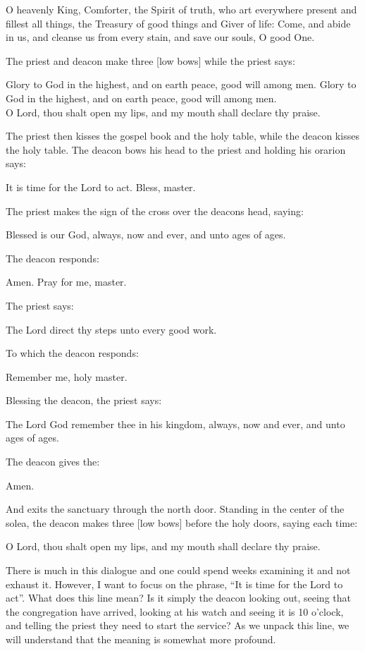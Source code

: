 \documentclass[
]{article}
\begin{document}
O heavenly King, Comforter, the Spirit of truth, who art everywhere
present and fillest all things, the Treasury of good things and Giver of
life: Come, and abide in us, and cleanse us from every stain, and save
our souls, O good One.

The priest and deacon make three {[}low bows{]} while the priest says:

Glory to God in the highest, and on earth peace, good will among men.
Glory to God in the highest, and on earth peace, good will among men.\\
O Lord, thou shalt open my lips, and my mouth shall declare thy praise.

The priest then kisses the gospel book and the holy table, while the
deacon kisses the holy table. The deacon bows his head to the priest and
holding his orarion says:

It is time for the Lord to act. Bless, master.

The priest makes the sign of the cross over the deacon\textquotesingle s
head, saying:

Blessed is our God, always, now and ever, and unto ages of ages.

The deacon responds:

Amen. Pray for me, master.

The priest says:

The Lord direct thy steps unto every good work.

To which the deacon responds:

Remember me, holy master.

Blessing the deacon, the priest says:

The Lord God remember thee in his kingdom, always, now and ever, and
unto ages of ages.

The deacon gives the:

Amen.

And exits the sanctuary through the north door. Standing in the center
of the solea, the deacon makes three {[}low bows{]} before the holy
doors, saying each time:

O Lord, thou shalt open my lips, and my mouth shall declare thy praise.

There is much in this dialogue and one could spend weeks examining it
and not exhaust it. However, I want to focus on the phrase, ``It is time
for the Lord to act''. What does this line mean? Is it simply the deacon
looking out, seeing that the congregation have arrived, looking at his
watch and seeing it is 10 o'clock, and telling the priest they need to
start the service? As we unpack this line, we will understand that the
meaning is somewhat more profound.
\end{document}
